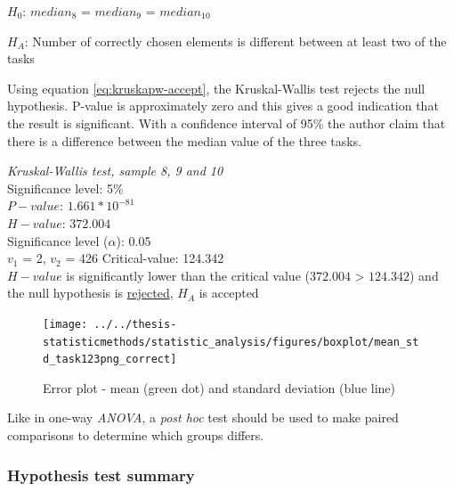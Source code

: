 \centerline{$H_{0}$: $median_8$ = $median_9$ = $median_10$}
\centerline{$H_{A}$: Number of correctly chosen elements is different between at least two of the tasks}

Using equation \ref{eq:kruskapw-accept}, the Kruskal-Wallis test rejects the null hypothesis. P-value is approximately zero and this gives a good indication that the result is significant. With a confidence interval of 95\% the author claim that there is a difference between the median value of the three tasks.

 \begin{center}
	\begin{tcolorbox}[box align=center,width=\textwidth-5cm]
		\centering
		\textit{Kruskal-Wallis test, sample 8, 9 and 10}\\
		Significance level: 5\%  \\[0.5cm]
		
		$P-value$: $1.661* 10^{-81}$ \\
		$H-value$: $372.004$ \\
		Significance level ($\alpha$): 0.05 \\
		$v_1$ = 2, $v_2$ = 426
		Critical-value: 124.342 \\[0.2cm] %
		
		$H-value$ is significantly lower than the critical value ($372.004$ > $124.342$) and the null hypothesis is \underline{rejected}, $H_A$ is accepted\\[0.5cm]
	\end{tcolorbox} 
\end{center}

\begin{figure}[h!]
	\centering
	\texttt{[image: ../../thesis-statisticmethods/statistic\_analysis/figures/boxplot/mean\_std\_task123png\_correct]}
	\caption{Error plot - mean (green dot) and standard deviation (blue line)}
	\label{fig:meanstdtask123pngcorrect}
\end{figure}

Like in one-way \textit{ANOVA}, a \textit{post hoc} test should be used to make paired comparisons to determine which groups differs. 

\subsubsection{Hypothesis test summary}

